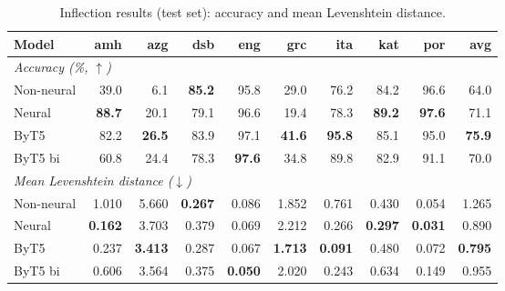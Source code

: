 \begin{table}[h]
\centering
\normalsize
\setlength{\tabcolsep}{5pt}
\renewcommand{\arraystretch}{1.10}
\begin{tabular}{lrrrrrrrrr}
\toprule
Model & amh & azg & dsb & eng & grc & ita & kat & por & avg \\
\midrule
\multicolumn{10}{l}{\textit{Accuracy (\%, $\uparrow$)}} \\
Non-neural & 39.0 & 6.1 & \textbf{85.2} & 95.8 & 29.0 & 76.2 & 84.2 & 96.6 & 64.0 \\
Neural & \textbf{88.7} & 20.1 & 79.1 & 96.6 & 19.4 & 78.3 & \textbf{89.2} & \textbf{97.6} & 71.1 \\
ByT5 & 82.2 & \textbf{26.5} & 83.9 & 97.1 & \textbf{41.6} & \textbf{95.8} & 85.1 & 95.0 & \textbf{75.9} \\
ByT5 bi & 60.8 & 24.4 & 78.3 & \textbf{97.6} & 34.8 & 89.8 & 82.9 & 91.1 & 70.0 \\
\midrule
\multicolumn{10}{l}{\textit{Mean Levenshtein distance ($\downarrow$)}} \\
Non-neural & 1.010 & 5.660 & \textbf{0.267} & 0.086 & 1.852 & 0.761 & 0.430 & 0.054 & 1.265 \\
Neural & \textbf{0.162} & 3.703 & 0.379 & 0.069 & 2.212 & 0.266 & \textbf{0.297} & \textbf{0.031} & 0.890 \\
ByT5 & 0.237 & \textbf{3.413} & 0.287 & 0.067 & \textbf{1.713} & \textbf{0.091} & 0.480 & 0.072 & \textbf{0.795} \\
ByT5 bi & 0.606 & 3.564 & 0.375 & \textbf{0.050} & 2.020 & 0.243 & 0.634 & 0.149 & 0.955 \\
\bottomrule
\end{tabular}
\caption{Inflection results (test set): accuracy and mean Levenshtein distance.}
\label{tab:results-inflection-matrix}
\end{table}